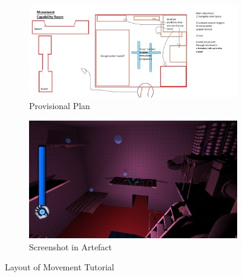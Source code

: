 \begin{figure}[H]
\centering
\begin{subfigure}{0.45\textwidth}
  \centering
  \includegraphics[width=1\linewidth]{Figures/mcapplan.png}
  \caption{Provisional Plan}
\end{subfigure}%
\begin{subfigure}{0.45\textwidth}
  \centering
  \includegraphics[width=1\linewidth]{Figures/mcap.png}
  \caption{Screenshot in Artefact}
\end{subfigure}
\caption{Layout of Movement Tutorial}
\label{moves}
\end{figure}

